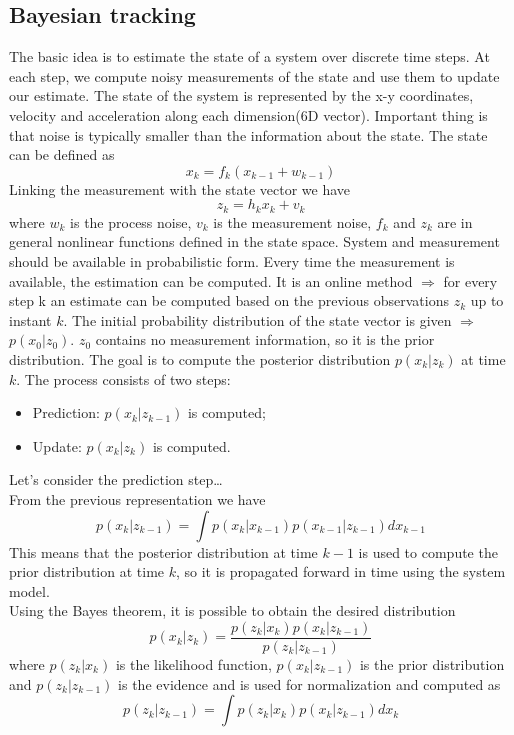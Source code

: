 \subsection{Bayesian tracking}
The basic idea is to estimate the state of a system over discrete time steps.
At each step, we compute noisy measurements of the state and use them to update our estimate.
The state of the system is represented by the x-y coordinates, velocity and acceleration along each dimension(6D vector).
Important thing is that noise is typically smaller than the information about the state.
The state can be defined as \[x_k = f_k(x_{k-1} + w_{k-1})\]
Linking the measurement with the state vector we have \[z_k = h_k x_k + v_k\]
where $w_k$ is the process noise, $v_k$ is the measurement noise, $f_k$ and $z_k$ are in general nonlinear functions defined in the state space.
System and measurement should be available in probabilistic form.
Every time the measurement is available, the estimation can be computed.
It is an online method $\Rightarrow$ for every step k an estimate can be computed based on the
previous observations $z_k$ up to instant $k$.
The initial probability distribution of the state vector is given $\Rightarrow$ $p(x_0|z_0)$.
$z_0$ contains no measurement information, so it is the prior distribution.
The goal is to compute the posterior distribution $p(x_k|z_k)$ at time $k$.
The process consists of two steps:
\begin{itemize}
    \item Prediction: $p(x_k|z_{k-1})$ is computed;
    \item Update: $p(x_k|z_k)$ is computed.
\end{itemize}
Let's consider the prediction step\dots\\
From the previous representation we have \[p(x_k|z_{k-1}) = \int p(x_k|x_{k-1})p(x_{k-1}|z_{k-1})dx_{k-1}\]
This means that the posterior distribution at time $k-1$ is used to compute the prior distribution at time $k$, so it is propagated forward in time using the system model.
\\Using the Bayes theorem, it is possible to obtain the desired distribution \[p(x_k|z_k) = \frac{p(z_k|x_k)p(x_k|z_{k-1})}{p(z_k|z_{k-1})}\]
where $p(z_k|x_k)$ is the likelihood function, $p(x_k|z_{k-1})$ is the prior distribution and $p(z_k|z_{k-1})$ is the evidence and is used for normalization and computed as \[p(z_k|z_{k-1}) = \int p(z_k|x_k)p(x_k|z_{k-1})dx_k\]

